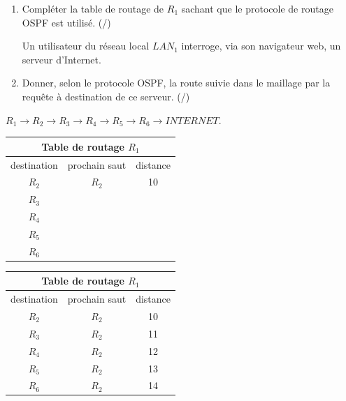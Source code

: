 \begin{minipage}[h]{0.50\linewidth}
\begin{enumerate}[resume=monDS]
        \item Compléter la table de routage de $R_1$ sachant que le protocole de routage OSPF est utilisé. (/)

Un utilisateur du réseau local $LAN_1$ interroge, via son navigateur web, un serveur d'Internet.

\item Donner, selon le protocole OSPF, la route suivie dans le maillage par la requête à destination de ce serveur. (/)
    \end{enumerate}
    
\begin{blocvisiblex}[height=1]   
    {}
    $R_1 \rightarrow R_2 \rightarrow R_3 \rightarrow R_4 \rightarrow R_5 \rightarrow R_6 \rightarrow INTERNET$.
    \end{blocvisiblex}
\end{minipage}\hfill{}
\begin{minipage}[h]{0.45\linewidth}
    \begin{blocvisiblex}[height=5]
{    \centering
    \renewcommand{\arraystretch}{1.3} %
    \begin{tabular}{|c|c|c|}
        \hline
        \multicolumn{3}{|c|}{\textbf{Table de routage $R_1$}} \\ \hline
        destination & prochain saut & distance \\ \hline
        $R_2$       & $R_2$         & 10        \\ \hline
        $R_3$       &               &          \\ \hline
        $R_4$       &               &          \\ \hline
        $R_5$       &               &          \\ \hline
        $R_6$       &               &          \\ \hline
    \end{tabular}}
\centering
    \renewcommand{\arraystretch}{1.3} %
    \begin{tabular}{|c|c|c|}
        \hline
        \multicolumn{3}{|c|}{\textbf{Table de routage $R_1$}} \\ \hline
        destination & prochain saut & distance \\ \hline
        $R_2$       & $R_2$         & 10        \\ \hline
        $R_3$       & $R_2$              &  11        \\ \hline
        $R_4$       & $R_2$              &  12        \\ \hline
        $R_5$       & $R_2$              &  13        \\ \hline
        $R_6$       & $R_2$              &  14        \\ \hline
        
    \end{tabular}
\end{blocvisiblex}
\end{minipage}

